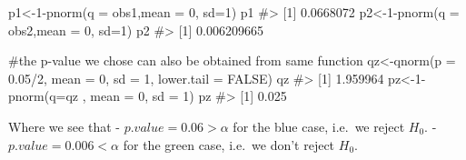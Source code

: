 \documentclass[
  letterpaper,
  DIV=11,
  numbers=noendperiod]{scrreprt}
\newenvironment{Shaded}{\begin{snugshade}}{\end{snugshade}}
\newcommand{\AttributeTok}[1]{\textcolor[rgb]{0.40,0.45,0.13}{#1}}
\newcommand{\CommentTok}[1]{\textcolor[rgb]{0.37,0.37,0.37}{#1}}
\newcommand{\ConstantTok}[1]{\textcolor[rgb]{0.56,0.35,0.01}{#1}}
\newcommand{\DecValTok}[1]{\textcolor[rgb]{0.68,0.00,0.00}{#1}}
\newcommand{\FloatTok}[1]{\textcolor[rgb]{0.68,0.00,0.00}{#1}}
\newcommand{\FunctionTok}[1]{\textcolor[rgb]{0.28,0.35,0.67}{#1}}
\newcommand{\NormalTok}[1]{\textcolor[rgb]{0.00,0.23,0.31}{#1}}
\newcommand{\OtherTok}[1]{\textcolor[rgb]{0.00,0.23,0.31}{#1}}
\newcommand{\SpecialCharTok}[1]{\textcolor[rgb]{0.37,0.37,0.37}{#1}}
\begin{document}
\begin{Shaded}
\begin{Highlighting}[]
\NormalTok{p1}\OtherTok{\textless{}{-}}\DecValTok{1}\SpecialCharTok{{-}}\FunctionTok{pnorm}\NormalTok{(}\AttributeTok{q =}\NormalTok{ obs1,}\AttributeTok{mean =} \DecValTok{0}\NormalTok{, }\AttributeTok{sd=}\DecValTok{1}\NormalTok{)}
\NormalTok{p1}
\CommentTok{\#\textgreater{} [1] 0.0668072}
\NormalTok{p2}\OtherTok{\textless{}{-}}\DecValTok{1}\SpecialCharTok{{-}}\FunctionTok{pnorm}\NormalTok{(}\AttributeTok{q =}\NormalTok{ obs2,}\AttributeTok{mean =} \DecValTok{0}\NormalTok{, }\AttributeTok{sd=}\DecValTok{1}\NormalTok{)}
\NormalTok{p2}
\CommentTok{\#\textgreater{} [1] 0.006209665}

\CommentTok{\#the p{-}value we chose can also be obtained from same function}
\NormalTok{qz}\OtherTok{\textless{}{-}}\FunctionTok{qnorm}\NormalTok{(}\AttributeTok{p =} \FloatTok{0.05}\SpecialCharTok{/}\DecValTok{2}\NormalTok{, }\AttributeTok{mean =} \DecValTok{0}\NormalTok{, }\AttributeTok{sd =} \DecValTok{1}\NormalTok{, }\AttributeTok{lower.tail =} \ConstantTok{FALSE}\NormalTok{)}
\NormalTok{qz}
\CommentTok{\#\textgreater{} [1] 1.959964}
\NormalTok{pz}\OtherTok{\textless{}{-}}\DecValTok{1}\SpecialCharTok{{-}}\FunctionTok{pnorm}\NormalTok{(}\AttributeTok{q=}\NormalTok{qz , }\AttributeTok{mean =} \DecValTok{0}\NormalTok{, }\AttributeTok{sd =} \DecValTok{1}\NormalTok{)}
\NormalTok{pz}
\CommentTok{\#\textgreater{} [1] 0.025}
\end{Highlighting}
\end{Shaded}

Where we see that - \(p.value = 0.06  > \alpha\) for the blue case,
i.e.~we reject \(H_0\). - \(p.value = 0.006  < \alpha\) for the green
case, i.e.~we don't reject \(H_0\).
\end{document}
